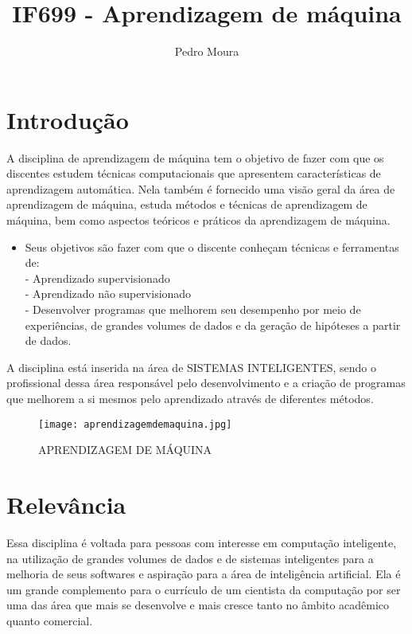 \documentclass[10pt]{article}
\title{IF699 - Aprendizagem de máquina}
\author{Pedro Moura}
\date{\vspace{-5ex}}
\begin{document}
\maketitle

\section{Introdução}

A disciplina de aprendizagem de máquina tem o objetivo de fazer com que os discentes estudem técnicas computacionais que apresentem características de aprendizagem automática. Nela também é fornecido uma visão geral da área de aprendizagem de máquina, estuda métodos e técnicas de aprendizagem de máquina, bem como aspectos teóricos e práticos da aprendizagem de máquina.

\begin{itemize}
  \item Seus objetivos são fazer com que o discente conheçam técnicas e ferramentas de:
\\- Aprendizado supervisionado
\\ - Aprendizado não supervisionado
\\ - Desenvolver programas que melhorem seu desempenho por meio de experiências, de grandes volumes de dados e da geração de hipóteses a partir de dados.
\end{itemize}

A disciplina está inserida na área de SISTEMAS INTELIGENTES, sendo o profissional dessa área responsável pelo desenvolvimento e a criação de programas que melhorem a si mesmos pelo aprendizado através de diferentes métodos.

\begin{figure}[]
    \centering
    \texttt{[image: aprendizagemdemaquina.jpg]}
    \caption{APRENDIZAGEM DE MÁQUINA \cite{quarta}}
    \label{fig:realidadevirtual}
\end{figure}

\section{Relevância}
Essa disciplina é voltada para pessoas com interesse em computação inteligente, na utilização de grandes volumes de dados e de sistemas inteligentes para a melhoria de seus softwares e aspiração para a área de inteligência artificial. Ela é um grande complemento para o currículo de um cientista da computação por ser uma das área que mais se desenvolve e mais cresce tanto no âmbito acadêmico quanto comercial.\cite{primeira}
\end{document}
